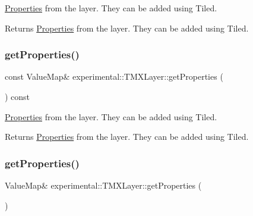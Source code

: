 \hyperlink{classProperties}{Properties} from the layer. They can be added using Tiled.

\begin{DoxyReturn}{Returns}
\hyperlink{classProperties}{Properties} from the layer. They can be added using Tiled. 
\end{DoxyReturn}
\mbox{\label{classexperimental_1_1TMXLayer_a1c2e4bb7d2ab4683b6c1d8c784b867bc}} 
\subsubsection{\texorpdfstring{get\+Properties()}{getProperties()}\hspace{0.1cm}{\footnotesize\ttfamily [2/4]}}
{\footnotesize\ttfamily const Value\+Map\& experimental\+::\+T\+M\+X\+Layer\+::get\+Properties (\begin{DoxyParamCaption}{ }\end{DoxyParamCaption}) const\hspace{0.3cm}{\ttfamily [inline]}}

\hyperlink{classProperties}{Properties} from the layer. They can be added using Tiled.

\begin{DoxyReturn}{Returns}
\hyperlink{classProperties}{Properties} from the layer. They can be added using Tiled. 
\end{DoxyReturn}
\mbox{\label{classexperimental_1_1TMXLayer_a356924361624560f9964aa9140a1f94a}} 
\subsubsection{\texorpdfstring{get\+Properties()}{getProperties()}\hspace{0.1cm}{\footnotesize\ttfamily [3/4]}}
{\footnotesize\ttfamily Value\+Map\& experimental\+::\+T\+M\+X\+Layer\+::get\+Properties (\begin{DoxyParamCaption}{ }\end{DoxyParamCaption})\hspace{0.3cm}{\ttfamily [inline]}}

